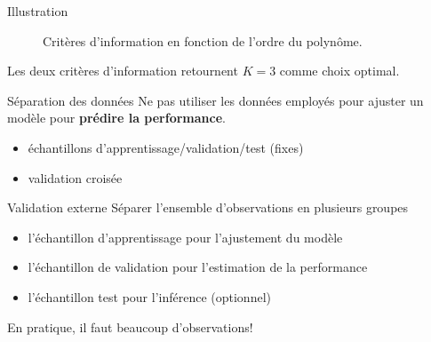 \documentclass[
  ignorenonframetext,
]{beamer}
\providecommand{\tightlist}{%
  \setlength{\itemsep}{0pt}\setlength{\parskip}{0pt}}\usepackage{longtable,booktabs,array}
\begin{document}
\begin{frame}{Illustration}
\label{illustration}
\begin{figure}


\caption{\label{fig-polynome-ajustement}Critères d'information en
fonction de l'ordre du polynôme.}

\end{figure}%

Les deux critères d'information retournent \(K=3\) comme choix optimal.
\end{frame}

\begin{frame}{Séparation des données}
\label{suxe9paration-des-donnuxe9es}
Ne pas utiliser les données employés pour ajuster un modèle pour
\textbf{prédire la performance}.

\begin{itemize}
\tightlist
\item
  échantillons d'apprentissage/validation/test (fixes)
\item
  validation croisée
\end{itemize}
\end{frame}

\begin{frame}{Validation externe}
\label{validation-externe}
Séparer l'ensemble d'observations en plusieurs groupes

\begin{itemize}
\tightlist
\item
  l'échantillon d'apprentissage pour l'ajustement du modèle
\item
  l'échantillon de validation pour l'estimation de la performance
\item
  l'échantillon test pour l'inférence (optionnel)
\end{itemize}

En pratique, il faut beaucoup d'observations!
\end{frame}
\end{document}
